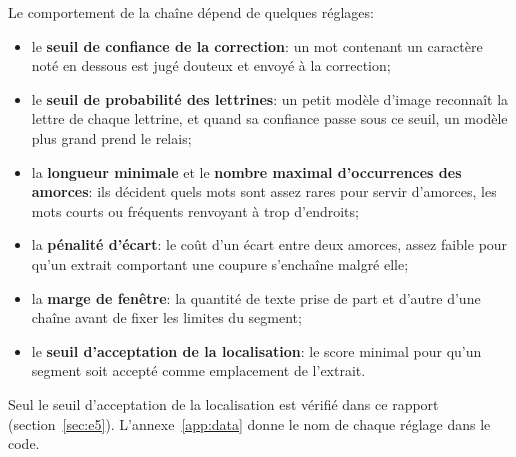 Le comportement de la chaîne dépend de quelques réglages:
\begin{itemize}
  \item le \textbf{seuil de confiance de la correction}: un mot contenant un
    caractère noté en dessous est jugé douteux et envoyé à la correction;
  \item le \textbf{seuil de probabilité des lettrines}: un petit modèle d'image
    reconnaît la lettre de chaque lettrine, et quand sa confiance passe sous ce
    seuil, un modèle plus grand prend le relais;
  \item la \textbf{longueur minimale} et le \textbf{nombre maximal
    d'occurrences des amorces}: ils décident quels mots sont assez rares pour
    servir d'amorces, les mots courts ou fréquents renvoyant à trop d'endroits;
  \item la \textbf{pénalité d'écart}: le coût d'un écart entre deux amorces,
    assez faible pour qu'un extrait comportant une coupure s'enchaîne malgré
    elle;
  \item la \textbf{marge de fenêtre}: la quantité de texte prise de part et
    d'autre d'une chaîne avant de fixer les limites du segment;
  \item le \textbf{seuil d'acceptation de la localisation}: le score minimal
    pour qu'un segment soit accepté comme emplacement de l'extrait.
\end{itemize}
Seul le seuil d'acceptation de la localisation est vérifié dans ce rapport
(section~\ref{sec:e5}). L'annexe~\ref{app:data} donne le nom de chaque réglage
dans le code.

